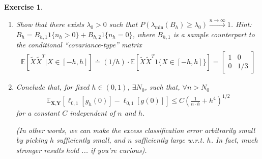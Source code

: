 \documentclass[12pt]{article}
\theoremstyle{colon}
\newtheorem{exercise}{Exercise}
\begin{document}
\begin{exercise}
\begin{enumerate}[label=\arabic*)]
\begin{enumerate}[label=\alph*)]
        \item Show that there exists $\lambda_0 > 0$ such that $P(\lambda_{\min}(B_h) \geq \lambda_0) \xrightarrow{n \rightarrow \infty} 1$.
          Hint: $B_h = B_{h,1} 1\{ n_h > 0\} + B_{h,2} 1\{ n_h = 0 \}$, where $B_{h,1}$ is a sample counterpart to the conditional ``covariance-type'' matrix
          \begin{gather*}
            \mathbb{E} [ \tilde{X} \tilde{X}^T | X \in [-h,h]] \doteq (1/h) \cdot \mathbb{E} [ \tilde{X} \tilde{X}^T 1\{ X \in [-h,h] \} ] = \begin{bmatrix} 1 & 0 \\ 0 & 1/3 \end{bmatrix}
          \end{gather*}

        \item Conclude that, for fixed $h \in (0,1)$, $\exists N_0$, such that, $\forall n > N_0$
          \begin{gather*}
            \mathbb{E}_{\textbf{X}, \textbf{Y}} \left[ \ell_{0,1}[g_h(0)] - \ell_{0,1}[g(0)] \right] \leq C \left( \frac{1}{n \cdot h} + h^4 \right)^{1/2}
          \end{gather*}
          for a constant $C$ independent of $n$ and $h$.

          (In other words, we can make the excess classification error arbitrarily small by picking $h$ sufficiently small, and $n$ sufficiently large w.r.t. $h$. In fact, much stronger results hold ... if you're curious).
      \end{enumerate}
  \end{enumerate}
\end{exercise}
\end{document}
